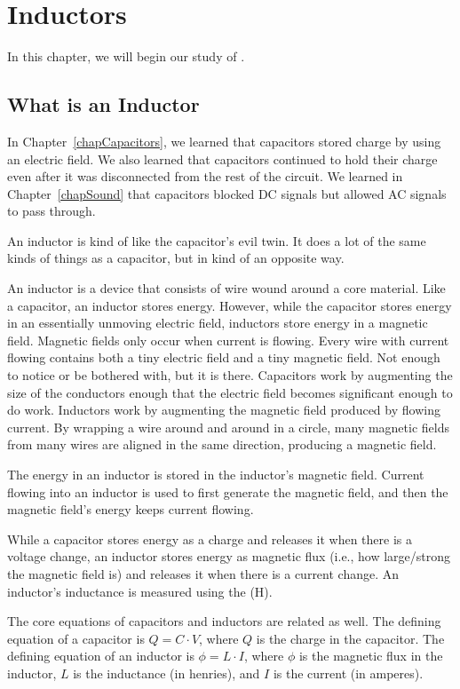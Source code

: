 \chapter{Inductors}
\label{chapInductors}

In this chapter, we will begin our study of .

\section{What is an Inductor}

In Chapter~\ref{chapCapacitors}, we learned that capacitors stored charge by using an electric field.
We also learned that capacitors continued to hold their charge even after it was disconnected from the rest of the circuit.
We learned in Chapter~\ref{chapSound} that capacitors blocked DC signals but allowed AC signals to pass through.

An inductor is kind of like the capacitor's evil twin.  
It does a lot of the same kinds of things as a capacitor, but in kind of an opposite way.

An inductor is a device that consists of wire wound around a core material.
Like a capacitor, an inductor stores energy.
However, while the capacitor stores energy in an essentially unmoving electric field, inductors store energy in a magnetic field.
Magnetic fields only occur when current is flowing.
Every wire with current flowing contains both a tiny electric field and a tiny magnetic field.
Not enough to notice or be bothered with, but it is there.
Capacitors work by augmenting the size of the conductors enough that the electric field becomes significant enough to do work.
Inductors work by augmenting the magnetic field produced by flowing current.
By wrapping a wire around and around in a circle, many magnetic fields from many wires are aligned in the same direction, producing a magnetic field.

The energy in an inductor is stored in the inductor's magnetic field.
Current flowing into an inductor is used to first generate the magnetic field, and then the magnetic field's energy keeps current flowing.

While a capacitor stores energy as a charge and releases it when there is a voltage change, an inductor stores energy as magnetic flux (i.e., how large/strong the magnetic field is) and releases it when there is a current change.
An inductor's inductance is measured using the  (H).

The core equations of capacitors and inductors are related as well.
The defining equation of a capacitor is $Q = C\cdot V$, where $Q$ is the charge in the capacitor.
The defining equation of an inductor is $\phi = L\cdot I$, where $\phi$ is the magnetic flux in the inductor, $L$ is the inductance (in henries), and $I$ is the current (in amperes).




